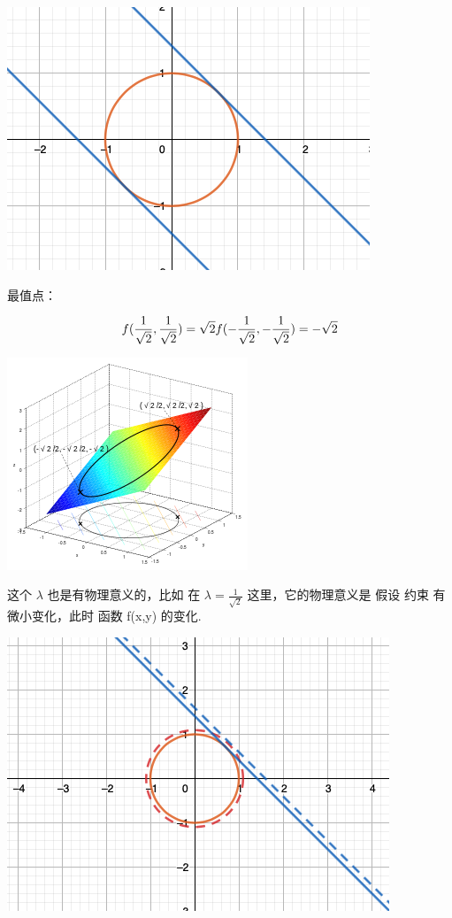 \documentclass[
]{book}
\begin{document}
\includegraphics{images/min_max_point.png}

最值点：

\[
f(\frac{1}{\sqrt{2}}, \frac{1}{\sqrt{2}}) = \sqrt{2}\\
f(-\frac{1}{\sqrt{2}}, -\frac{1}{\sqrt{2}}) = -\sqrt{2}\\
\]

\includegraphics{images/272px-Lagrange_very_simple.png}

这个 \(\lambda\) 也是有物理意义的，比如 在 \(\lambda = \frac{1}{\sqrt{2}}\) 这里，它的物理意义是 假设 约束 有微小变化，此时 函数 f(x,y) 的变化.

\includegraphics{images/lambda_meaning.png}
\end{document}
